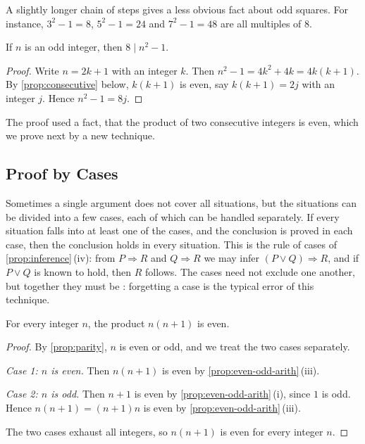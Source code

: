 A slightly longer chain of steps gives a less obvious fact about odd squares. For instance, $3^2-1=8$, $5^2-1=24$ and $7^2-1=48$ are all multiples of $8$.

\begin{proposition}
\label{prop:odd-square}
If $n$ is an odd integer, then $8\mid n^2-1$.
\end{proposition}

\begin{proof}
Write $n=2k+1$ with an integer $k$. Then $n^2-1=4k^2+4k=4k(k+1)$. By \cref{prop:consecutive} below, $k(k+1)$ is even, say $k(k+1)=2j$ with an integer $j$. Hence $n^2-1=8j$.
\end{proof}

The proof used a fact, that the product of two consecutive integers is even, which we prove next by a new technique.

\subsection{Proof by Cases}

Sometimes a single argument does not cover all situations, but the situations can be divided into a few cases, each of which can be handled separately. If every situation falls into at least one of the cases, and the conclusion is proved in each case, then the conclusion holds in every situation. This is the rule of cases of \cref{prop:inference}\,(iv): from $P\Rightarrow R$ and $Q\Rightarrow R$ we may infer $(P\vee Q)\Rightarrow R$, and if $P\vee Q$ is known to hold, then $R$ follows. The cases need not exclude one another, but together they must be : forgetting a case is the typical error of this technique.

\begin{proposition}
\label{prop:consecutive}
For every integer $n$, the product $n(n+1)$ is even.
\end{proposition}

\begin{proof}
By \cref{prop:parity}, $n$ is even or odd, and we treat the two cases separately.

\emph{Case 1: $n$ is even.} Then $n(n+1)$ is even by \cref{prop:even-odd-arith}\,(iii).

\emph{Case 2: $n$ is odd.} Then $n+1$ is even by \cref{prop:even-odd-arith}\,(i), since $1$ is odd. Hence $n(n+1)=(n+1)n$ is even by \cref{prop:even-odd-arith}\,(iii).

The two cases exhaust all integers, so $n(n+1)$ is even for every integer $n$.
\end{proof}

